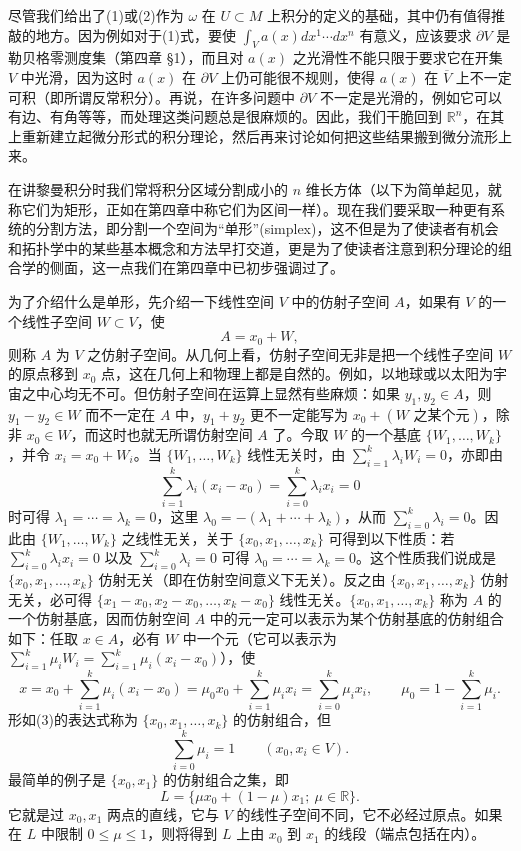 尽管我们给出了(1)或(2)作为 $\omega$ 在 $U\subset M$ 上积分的定义的基础，其中仍有值得推敲的地方。因为例如对于(1)式，要使 $\int_Va(x)dx^1\cdots dx^n$ 有意义，应该要求 $\partial V$ 是勒贝格零测度集（第四章 §1），而且对 $a(x)$ 之光滑性不能只限于要求它在开集 $V$ 中光滑，因为这时 $a(x)$ 在 $\partial V$ 上仍可能很不规则，使得 $a(x)$ 在 $\overline V$ 上不一定可积（即所谓反常积分）。再说，在许多问题中 $\partial V$ 不一定是光滑的，例如它可以有边、有角等等，而处理这类问题总是很麻烦的。因此，我们干脆回到 $\mathbb R^n$，在其上重新建立起微分形式的积分理论，然后再来讨论如何把这些结果搬到微分流形上来。

在讲黎曼积分时我们常将积分区域分割成小的 $n$ 维长方体（以下为简单起见，就称它们为矩形，正如在第四章中称它们为区间一样）。现在我们要采取一种更有系统的分割方法，即分割一个空间为“单形”(simplex)，这不但是为了使读者有机会和拓扑学中的某些基本概念和方法早打交道，更是为了使读者注意到积分理论的组合学的侧面，这一点我们在第四章中已初步强调过了。

为了介绍什么是单形，先介绍一下线性空间 $V$ 中的仿射子空间 $A$，如果有 $V$ 的一个线性子空间 $W\subset V$，使
\[
 A=x_0+W,
\]
则称 $A$ 为 $V$ 之仿射子空间。从几何上看，仿射子空间无非是把一个线性子空间 $W$ 的原点移到 $x_0$ 点，这在几何上和物理上都是自然的。例如，以地球或以太阳为宇宙之中心均无不可。但仿射子空间在运算上显然有些麻烦：如果 $y_1,y_2\in A$，则 $y_1-y_2\in W$ 而不一定在 $A$ 中，$y_1+y_2$ 更不一定能写为 $x_0+(W\text{ 之某个元})$，除非 $x_0\in W$，而这时也就无所谓仿射空间 $A$ 了。今取 $W$ 的一个基底 $\{W_1,\ldots,W_k\}$，并令 $x_i=x_0+W_i$。当 $\{W_1,\ldots,W_k\}$ 线性无关时，由 $\sum_{i=1}^k\lambda_iW_i=0$，亦即由
\[
 \sum_{i=1}^k\lambda_i(x_i-x_0)=\sum_{i=0}^k\lambda_i x_i=0
\]
时可得 $\lambda_1=\cdots=\lambda_k=0$，这里 $\lambda_0=-(\lambda_1+\cdots+\lambda_k)$，从而 $\sum_{i=0}^k\lambda_i=0$。因此由 $\{W_1,\ldots,W_k\}$ 之线性无关，关于 $\{x_0,x_1,\ldots,x_k\}$ 可得到以下性质：若 $\sum_{i=0}^k\lambda_i x_i=0$ 以及 $\sum_{i=0}^k\lambda_i=0$ 可得 $\lambda_0=\cdots=\lambda_k=0$。这个性质我们说成是 $\{x_0,x_1,\ldots,x_k\}$ 仿射无关（即在仿射空间意义下无关）。反之由 $\{x_0,x_1,\ldots,x_k\}$ 仿射无关，必可得 $\{x_1-x_0,x_2-x_0,\ldots,x_k-x_0\}$ 线性无关。$\{x_0,x_1,\ldots,x_k\}$ 称为 $A$ 的一个仿射基底，因而仿射空间 $A$ 中的元一定可以表示为某个仿射基底的仿射组合如下：任取 $x\in A$，必有 $W$ 中一个元（它可以表示为 $\sum_{i=1}^k\mu_iW_i=\sum_{i=1}^k\mu_i(x_i-x_0)$），使
\begin{equation}
 x=x_0+\sum_{i=1}^k\mu_i(x_i-x_0)
 =\mu_0x_0+\sum_{i=1}^k\mu_i x_i
 =\sum_{i=0}^k\mu_i x_i,
 \qquad \mu_0=1-\sum_{i=1}^k\mu_i.
 \tag{3}
\end{equation}
形如(3)的表达式称为 $\{x_0,x_1,\ldots,x_k\}$ 的仿射组合，但
\begin{equation}
 \sum_{i=0}^k\mu_i=1\qquad (x_0,x_i\in V).
 \tag{4}
\end{equation}
最简单的例子是 $\{x_0,x_1\}$ 的仿射组合之集，即
\[
 L=\{\mu x_0+(1-\mu)x_1;\ \mu\in\mathbb R\}.
\]
它就是过 $x_0,x_1$ 两点的直线，它与 $V$ 的线性子空间不同，它不必经过原点。如果在 $L$ 中限制 $0\le\mu\le1$，则将得到 $L$ 上由 $x_0$ 到 $x_1$ 的线段（端点包括在内）。

